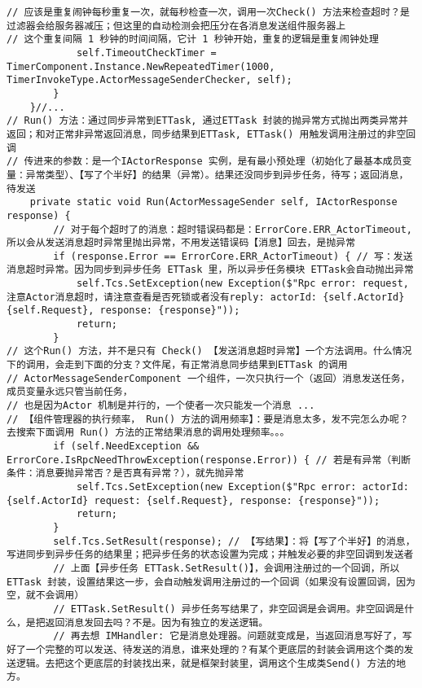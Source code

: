 \documentclass[9pt, b5paper]{article}
\begin{document}
\begin{itemize}
\begin{verbatim}
// 应该是重复闹钟每秒重复一次，就每秒检查一次，调用一次Check() 方法来检查超时？是过滤器会给服务器减压；但这里的自动检测会把压分在各消息发送组件服务器上
// 这个重复间隔 1 秒钟的时间间隔，它计 1 秒钟开始，重复的逻辑是重复闹钟处理
            self.TimeoutCheckTimer = TimerComponent.Instance.NewRepeatedTimer(1000, TimerInvokeType.ActorMessageSenderChecker, self);
        }
    }//...
// Run() 方法：通过同步异常到ETTask, 通过ETTask 封装的抛异常方式抛出两类异常并返回；和对正常非异常返回消息，同步结果到ETTask, ETTask() 用触发调用注册过的非空回调
// 传进来的参数：是一个IActorResponse 实例，是有最小预处理（初始化了最基本成员变量：异常类型）、【写了个半好】的结果（异常）。结果还没同步到异步任务，待写；返回消息，待发送
    private static void Run(ActorMessageSender self, IActorResponse response) { 
        // 对于每个超时了的消息：超时错误码都是：ErrorCore.ERR_ActorTimeout, 所以会从发送消息超时异常里抛出异常，不用发送错误码【消息】回去，是抛异常
        if (response.Error == ErrorCore.ERR_ActorTimeout) { // 写：发送消息超时异常。因为同步到异步任务 ETTask 里，所以异步任务模块 ETTask会自动抛出异常
            self.Tcs.SetException(new Exception($"Rpc error: request, 注意Actor消息超时，请注意查看是否死锁或者没有reply: actorId: {self.ActorId} {self.Request}, response: {response}"));
            return;
        }
// 这个Run() 方法，并不是只有 Check() 【发送消息超时异常】一个方法调用。什么情况下的调用，会走到下面的分支？文件尾，有正常消息同步结果到ETTask 的调用 
// ActorMessageSenderComponent 一个组件，一次只执行一个（返回）消息发送任务，成员变量永远只管当前任务，
// 也是因为Actor 机制是并行的，一个使者一次只能发一个消息 ...
// 【组件管理器的执行频率， Run() 方法的调用频率】：要是消息太多，发不完怎么办呢？去搜索下面调用 Run() 方法的正常结果消息的调用处理频率。。。
        if (self.NeedException && ErrorCore.IsRpcNeedThrowException(response.Error)) { // 若是有异常（判断条件：消息要抛异常否？是否真有异常？），就先抛异常
            self.Tcs.SetException(new Exception($"Rpc error: actorId: {self.ActorId} request: {self.Request}, response: {response}"));
            return;
        }
        self.Tcs.SetResult(response); // 【写结果】：将【写了个半好】的消息，写进同步到异步任务的结果里；把异步任务的状态设置为完成；并触发必要的非空回调到发送者
        // 上面【异步任务 ETTask.SetResult()】，会调用注册过的一个回调，所以ETTask 封装，设置结果这一步，会自动触发调用注册过的一个回调（如果没有设置回调，因为空，就不会调用）
        // ETTask.SetResult() 异步任务写结果了，非空回调是会调用。非空回调是什么，是把返回消息发回去吗？不是。因为有独立的发送逻辑。
        // 再去想 IMHandler: 它是消息处理器。问题就变成是，当返回消息写好了，写好了一个完整的可以发送、待发送的消息，谁来处理的？有某个更底层的封装会调用这个类的发送逻辑。去把这个更底层的封装找出来，就是框架封装里，调用这个生成类Send() 方法的地方。

\end{verbatim}
\end{itemize}
\end{document}
